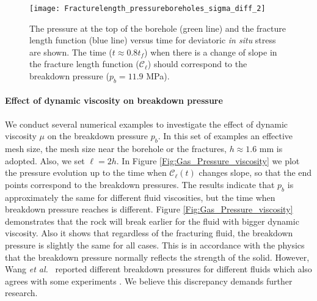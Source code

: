 \begin{figure}[htbp]
    \centering
    \texttt{[image: Fracturelength\_pressureboreholes\_sigma\_diff\_2]}
        \caption{The pressure at the top of the borehole (green line) and  the fracture length function (blue line) versus time for deviatoric \emph{in situ} stress are shown. The time ($t\approx 0.8t_f$) when there is a change of slope in the fracture length function ($\mathcal{C}_{\ell}$) should correspond to the breakdown pressure ($p_b=11.9$ MPa).}
    \label{Fig:Gas_pressure_Length_Sigma_diff}
\end{figure}

\paragraph{Effect of dynamic viscosity on breakdown pressure} We conduct several numerical examples to investigate the effect of dynamic viscosity $\mu$ on the breakdown pressure $p_b$. 
In this set of examples an effective mesh size, the mesh size near the borehole or the fractures, $h\approx 1.6$ mm is adopted. Also, we set $\ell=2h$. In Figure \ref{Fig:Gas_Pressure_viscosity} we plot the pressure evolution up to the time when  $\mathcal{C}_\ell(t)$ changes slope, so that the end points correspond to the breakdown pressures. The results indicate that $p_b$ is approximately the same for different fluid viscosities, but the time when breakdown pressure reaches  is different. Figure \ref{Fig:Gas_Pressure_viscosity} demonstrates that the rock will break earlier for the fluid with bigger dynamic viscosity. Also it shows that regardless of the fracturing fluid, the breakdown pressure is slightly the same for all cases. This is in accordance with the physics that the breakdown pressure normally reflects the strength of the solid. However, Wang \emph{et al.}~\cite{wang2018influence} reported different breakdown pressures for different fluids which also agrees with some experiments \cite{ishida2012acoustic, ishida2016features}. We believe this discrepancy demands further research.


